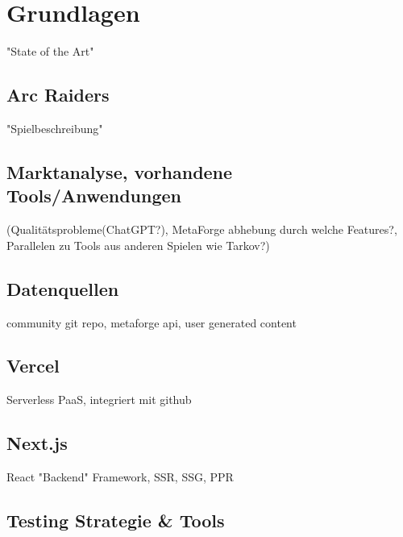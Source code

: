 \chapter{Grundlagen}
"State of the Art"
\section{Arc Raiders}
"Spielbeschreibung"
\section{Marktanalyse, vorhandene Tools/Anwendungen}
(Qualitätsprobleme(ChatGPT?), MetaForge abhebung durch welche Features?, Parallelen zu Tools aus anderen Spielen wie Tarkov?)
\section{Datenquellen}
community git repo, metaforge api, user generated content

\section{Vercel}
Serverless PaaS, integriert mit github
\section{Next.js}
React "Backend" Framework, SSR, SSG, PPR
\section{Testing Strategie \& Tools}

